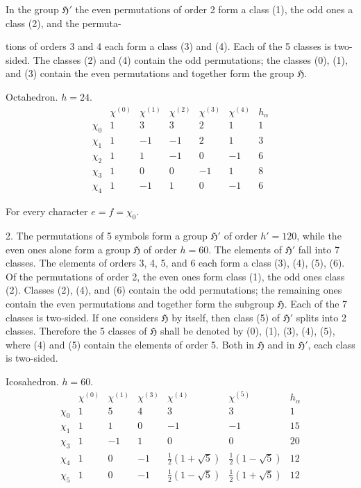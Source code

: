 \documentclass[11pt]{article}
\newcommand{\grp}{\mathfrak{H}}
\begin{document}
In the group $\grp'$ the even permutations of order 2 form a class (1), the odd ones a class (2), and the permuta-

tions of orders 3 and 4 each form a class (3) and (4). Each of the 5 classes is two-sided. The classes (2) and (4) contain the odd permutations; the classes (0), (1), and (3) contain the even permutations and together form the group $\grp$.

\begin{center}
Octahedron. $h=24$.
\[
\begin{array}{c|rrrrr|r}
 & \chi^{(0)} & \chi^{(1)} & \chi^{(2)} & \chi^{(3)} & \chi^{(4)} & h_\alpha\\ \hline
\chi_0 & 1 & 3 & 3 & 2 & 1 & 1\\
\chi_1 & 1 & -1 & -1 & 2 & 1 & 3\\
\chi_2 & 1 & 1 & -1 & 0 & -1 & 6\\
\chi_3 & 1 & 0 & 0 & -1 & 1 & 8\\
\chi_4 & 1 & -1 & 1 & 0 & -1 & 6
\end{array}
\]
\end{center}

For every character $e=f=\chi_0$.

2. The permutations of 5 symbols form a group $\grp'$ of order $h'=120$, while the even ones alone form a group $\grp$ of order $h=60$. The elements of $\grp'$ fall into 7 classes. The elements of orders 3, 4, 5, and 6 each form a class (3), (4), (5), (6). Of the permutations of order 2, the even ones form class (1), the odd ones class (2). Classes (2), (4), and (6) contain the odd permutations; the remaining ones contain the even permutations and together form the subgroup $\grp$. Each of the 7 classes is two-sided. If one considers $\grp$ by itself, then class (5) of $\grp'$ splits into 2 classes. Therefore the 5 classes of $\grp$ shall be denoted by (0), (1), (3), (4), (5), where (4) and (5) contain the elements of order 5. Both in $\grp$ and in $\grp'$, each class is two-sided.

\begin{center}
Icosahedron. $h=60$.
\[
\begin{array}{c|rrrrr|r}
 & \chi^{(0)} & \chi^{(1)} & \chi^{(3)} & \chi^{(4)} & \chi^{(5)} & h_\alpha\\ \hline
\chi_0 & 1 & 5 & 4 & 3 & 3 & 1\\
\chi_1 & 1 & 1 & 0 & -1 & -1 & 15\\
\chi_3 & 1 & -1 & 1 & 0 & 0 & 20\\
\chi_4 & 1 & 0 & -1 & \frac{1}{2}(1+\sqrt{5}) & \frac{1}{2}(1-\sqrt{5}) & 12\\
\chi_5 & 1 & 0 & -1 & \frac{1}{2}(1-\sqrt{5}) & \frac{1}{2}(1+\sqrt{5}) & 12
\end{array}
\]
\end{center}
\end{document}
